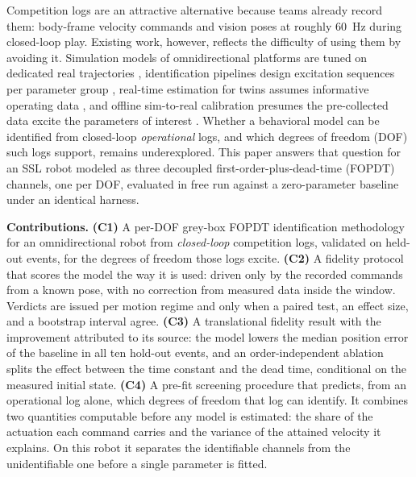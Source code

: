 Competition logs are an attractive alternative because teams already record them: body-frame velocity commands and vision poses at roughly \SI{60}{Hz} during closed-loop play. Existing work, however, reflects the difficulty of using them by avoiding it. Simulation models of omnidirectional platforms are
tuned on dedicated real trajectories \cite{wiedemann2024simulation,wiedemann2025automated}, identification pipelines design excitation sequences per parameter group \cite{giro2023otbot}, real-time estimation for twins assumes informative operating data \cite{kosmaga2026digital}, and offline sim-to-real calibration presumes the pre-collected data excite the parameters of interest \cite{tiboni2023dropo}. Whether a behavioral model can be identified from closed-loop \emph{operational} logs, and which degrees of freedom (DOF) such logs support, remains underexplored. This paper answers that question for an SSL robot modeled as three decoupled first-order-plus-dead-time (FOPDT) channels, one per DOF, evaluated in  free run against a zero-parameter baseline under an identical harness.

\noindent\textbf{Contributions.}
\textbf{(C1)} A per-DOF grey-box FOPDT identification methodology for an omnidirectional robot from \emph{closed-loop} competition logs, validated on held-out events, for the degrees of freedom those logs excite. 
\textbf{(C2)} A fidelity protocol that scores the model the way it is used: driven only by the recorded commands from a known pose, with no correction from measured data inside the window. Verdicts are issued per motion regime and only when a paired test, an effect size, and a bootstrap interval agree.
\textbf{(C3)} A translational fidelity result with the improvement attributed to its source: the model lowers the median position error of the baseline in all ten hold-out events, and an order-independent ablation splits the effect between the time constant and the dead time, conditional on the measured initial state.
\textbf{(C4)} A pre-fit screening procedure that predicts, from an operational log alone, which degrees of freedom that log can identify. It combines two quantities computable before any model is estimated: the share of the actuation each command carries and the variance of the attained velocity it explains. On this robot it separates the identifiable channels from the unidentifiable one before a single parameter is fitted.

